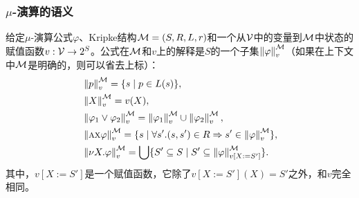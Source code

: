 \documentclass[9pt, CJK]{beamer}
\begin{document}
\begin{frame}
	\frametitle{$\mu$-演算的语义}
	{\footnotesize 
	\begin{definition}
		给定$\mu$-演算公式$\varphi$、Kripke结构${\cal M}=(S,R,L,r)$和一个从${\cal V}$中的变量到${\cal M}$中状态的赋值函数$v: {\cal V} \rightarrow 2^S$。公式在${\cal M}$和$v$上的解释是$S$的一个子集$\left\| \varphi\right\|_v^{{\cal M}}$（如果在上下文中${\cal M}$是明确的，则可以省去上标）：
		\begin{align*}
			& \left \| p\right \|_v^{{\cal M}} = \{s\mid p \in L(s)\}, \\  
			& \left\| X\right\|_v^{{\cal M}} = v(X),\\
			& \left\|\varphi_1 \vee \varphi_2\right\|_v^{{\cal M}} = \left\|\varphi_1\right\|_v^{{\cal M}} \cup \left\|\varphi_2\right\|_v^{{\cal M}},\\ 
			& \left\|\textsc{a} \textsc{x} \varphi\right\|_v^{{\cal M}} = \{s\mid \forall s'. (s, s') \in R \Rightarrow s' \in \left\|\varphi\right\|_v^{{\cal M}}\},\\ 
			& \left\| \nu X. \varphi\right\|_v^{{\cal M}} = \bigcup\{S' \subseteq S \mid S' \subseteq \left\|\varphi\right\|_{v[X:= S']}^{{\cal M}}\}.
		\end{align*}
		其中，$v[X:= S']$是一个赋值函数，它除了$v[X:= S'](X)=S'$之外，和$v$完全相同。
	\end{definition}
}
\end{frame}
\end{document}
